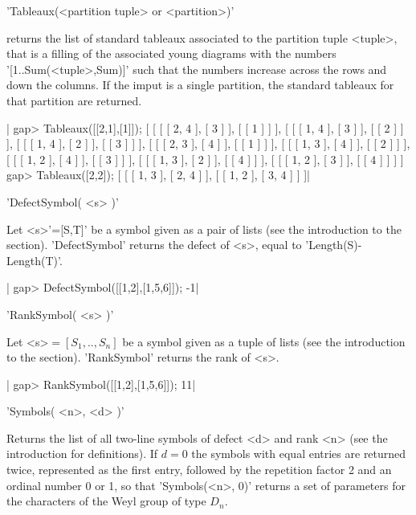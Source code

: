 'Tableaux(<partition tuple> or <partition>)'

returns  the list  of standard  tableaux associated  to the partition tuple
<tuple>,  that  is  a  filling  of  the  associated young diagrams with the
numbers  '[1..Sum(<tuple>,Sum)]' such that the  numbers increase across the
rows and down the columns. If the imput is a single partition, the standard
tableaux for that partition are returned.

|    gap> Tableaux([[2,1],[1]]);
    [ [ [ [ 2, 4 ], [ 3 ] ], [ [ 1 ] ] ],
      [ [ [ 1, 4 ], [ 3 ] ], [ [ 2 ] ] ],
      [ [ [ 1, 4 ], [ 2 ] ], [ [ 3 ] ] ],
      [ [ [ 2, 3 ], [ 4 ] ], [ [ 1 ] ] ],
      [ [ [ 1, 3 ], [ 4 ] ], [ [ 2 ] ] ],
      [ [ [ 1, 2 ], [ 4 ] ], [ [ 3 ] ] ],
      [ [ [ 1, 3 ], [ 2 ] ], [ [ 4 ] ] ],
      [ [ [ 1, 2 ], [ 3 ] ], [ [ 4 ] ] ] ]
    gap> Tableaux([2,2]);
    [ [ [ 1, 3 ], [ 2, 4 ] ], [ [ 1, 2 ], [ 3, 4 ] ] ]|


'DefectSymbol( <s> )'

Let  <s>'=[S,T]'  be  a  symbol  given  as a  pair  of  lists  (see  the
introduction to the  section). 'DefectSymbol' returns the  defect of <s>,
equal to 'Length(S)-Length(T)'.

|    gap> DefectSymbol([[1,2],[1,5,6]]);
    -1|


'RankSymbol( <s> )'

Let <s>$=[S_1,..,S_n]$  be a symbol given  as a tuple of  lists (see the
introduction to the section). 'RankSymbol' returns the rank of <s>.

|    gap> RankSymbol([[1,2],[1,5,6]]);
    11|


'Symbols( <n>, <d> )'

Returns  the list of all  two-line symbols of defect  <d> and rank <n> (see
the  introduction for definitions). If $d=0$ the symbols with equal entries
are  returned  twice,  represented  as  the  first  entry,  followed by the
repetition factor 2 and an ordinal number 0 or 1, so that 'Symbols(<n>, 0)'
returns  a set of parameters  for the characters of  the Weyl group of type
$D_n$.

